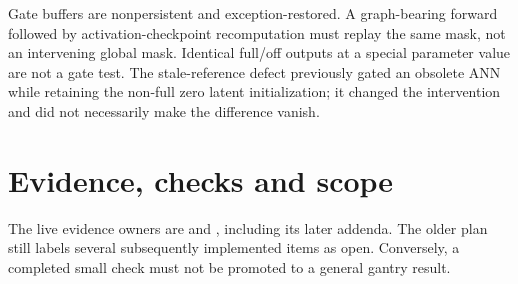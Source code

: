 \documentclass[11pt,a4paper]{article}
\theoremstyle{remark}
\begin{document}
Gate buffers are nonpersistent and exception-restored. A graph-bearing forward followed by activation-checkpoint recomputation must replay the same mask, not an intervening global mask. Identical full/off outputs at a special parameter value are not a gate test. The stale-reference defect previously gated an obsolete ANN while retaining the non-full zero latent initialization; it changed the intervention and did not necessarily make the difference vanish.

\section{Evidence, checks and scope}\label{sec:evidence}
The live evidence owners are
 and
, including its later addenda. The older plan still labels several subsequently implemented items as open. Conversely, a completed small check must not be promoted to a general gantry result.
\end{document}
